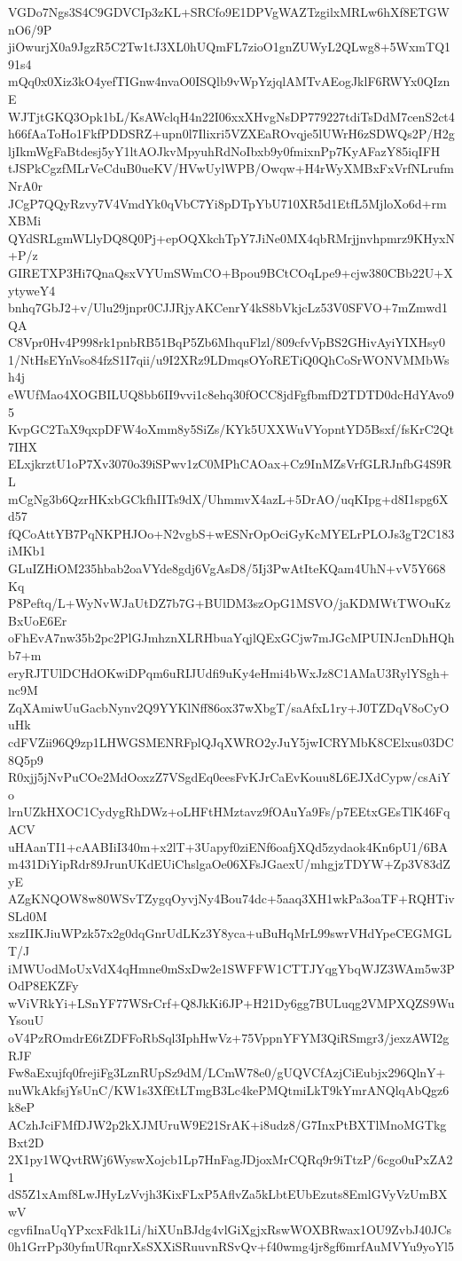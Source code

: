 VGDo7Ngs3S4C9GDVCIp3zKL+SRCfo9E1DPVgWAZTzgilxMRLw6hXf8ETGWnO6/9P
jiOwurjX0a9JgzR5C2Tw1tJ3XL0hUQmFL7zioO1gnZUWyL2QLwg8+5WxmTQ191s4
mQq0x0Xiz3kO4yefTIGnw4nvaO0ISQlb9vWpYzjqlAMTvAEogJklF6RWYx0QIznE
WJTjtGKQ3Opk1bL/KsAWclqH4n22I06xxXHvgNsDP779227tdiTsDdM7cenS2ct4
h66fAaToHo1FkfPDDSRZ+upn0l7Ilixri5VZXEaROvqje5lUWrH6zSDWQs2P/H2g
ljIkmWgFaBtdesj5yY1ltAOJkvMpyuhRdNoIbxb9y0fmixnPp7KyAFazY85iqIFH
tJSPkCgzfMLrVeCduB0ueKV/HVwUylWPB/Owqw+H4rWyXMBxFxVrfNLrufmNrA0r
JCgP7QQyRzvy7V4VmdYk0qVbC7Yi8pDTpYbU710XR5d1EtfL5MjloXo6d+rmXBMi
QYdSRLgmWLlyDQ8Q0Pj+epOQXkchTpY7JiNe0MX4qbRMrjjnvhpmrz9KHyxN+P/z
GIRETXP3Hi7QnaQsxVYUmSWmCO+Bpou9BCtCOqLpe9+cjw380CBb22U+XytyweY4
bnhq7GbJ2+v/Ulu29jnpr0CJJRjyAKCenrY4kS8bVkjcLz53V0SFVO+7mZmwd1QA
C8Vpr0Hv4P998rk1pnbRB51BqP5Zb6MhquFlzl/809cfvVpBS2GHivAyiYIXHsy0
1/NtHsEYnVso84fzS1I7qii/u9I2XRz9LDmqsOYoRETiQ0QhCoSrWONVMMbWsh4j
eWUfMao4XOGBILUQ8bb6II9vvi1c8ehq30fOCC8jdFgfbmfD2TDTD0dcHdYAvo95
KvpGC2TaX9qxpDFW4oXmm8y5SiZs/KYk5UXXWuVYopntYD5Bsxf/fsKrC2Qt7IHX
ELxjkrztU1oP7Xv3070o39iSPwv1zC0MPhCAOax+Cz9InMZsVrfGLRJnfbG4S9RL
mCgNg3b6QzrHKxbGCkfhIITs9dX/UhmmvX4azL+5DrAO/uqKIpg+d8I1spg6Xd57
fQCoAttYB7PqNKPHJOo+N2vgbS+wESNrOpOciGyKcMYELrPLOJs3gT2C183iMKb1
GLuIZHiOM235hbab2oaVYde8gdj6VgAsD8/5Ij3PwAtIteKQam4UhN+vV5Y668Kq
P8Peftq/L+WyNvWJaUtDZ7b7G+BUlDM3szOpG1MSVO/jaKDMWtTWOuKzBxUoE6Er
oFhEvA7nw35b2pc2PlGJmhznXLRHbuaYqjlQExGCjw7mJGcMPUINJcnDhHQhb7+m
eryRJTUlDCHdOKwiDPqm6uRIJUdfi9uKy4eHmi4bWxJz8C1AMaU3RylYSgh+nc9M
ZqXAmiwUuGacbNynv2Q9YYKlNff86ox37wXbgT/saAfxL1ry+J0TZDqV8oCyOuHk
cdFVZii96Q9zp1LHWGSMENRFplQJqXWRO2yJuY5jwICRYMbK8CElxus03DC8Q5p9
R0xjj5jNvPuCOe2MdOoxzZ7VSgdEq0eesFvKJrCaEvKouu8L6EJXdCypw/csAiYo
lrnUZkHXOC1CydygRhDWz+oLHFtHMztavz9fOAuYa9Fs/p7EEtxGEsTlK46FqACV
uHAanTI1+cAABIiI340m+x2lT+3Uapyf0ziENf6oafjXQd5zydaok4Kn6pU1/6BA
m431DiYipRdr89JrunUKdEUiChslgaOe06XFsJGaexU/mhgjzTDYW+Zp3V83dZyE
AZgKNQOW8w80WSvTZygqOyvjNy4Bou74dc+5aaq3XH1wkPa3oaTF+RQHTivSLd0M
xszIIKJiuWPzk57x2g0dqGnrUdLKz3Y8yca+uBuHqMrL99swrVHdYpeCEGMGLT/J
iMWUodMoUxVdX4qHmne0mSxDw2e1SWFFW1CTTJYqgYbqWJZ3WAm5w3POdP8EKZFy
wViVRkYi+LSnYF77WSrCrf+Q8JkKi6JP+H21Dy6gg7BULuqg2VMPXQZS9WuYsouU
oV4PzROmdrE6tZDFFoRbSql3IphHwVz+75VppnYFYM3QiRSmgr3/jexzAWI2gRJF
Fw8aExujfq0frejiFg3LznRUpSz9dM/LCmW78e0/gUQVCfAzjCiEubjx296QlnY+
nuWkAkfsjYsUnC/KW1s3XfEtLTmgB3Lc4kePMQtmiLkT9kYmrANQlqAbQgz6k8eP
ACzhJciFMfDJW2p2kXJMUruW9E21SrAK+i8udz8/G7InxPtBXTlMnoMGTkgBxt2D
2X1py1WQvtRWj6WyswXojcb1Lp7HnFagJDjoxMrCQRq9r9iTtzP/6cgo0uPxZA21
dS5Z1xAmf8LwJHyLzVvjh3KixFLxP5AflvZa5kLbtEUbEzuts8EmlGVyVzUmBXwV
cgvfiInaUqYPxcxFdk1Li/hiXUnBJdg4vlGiXgjxRswWOXBRwax1OU9ZvbJ40JCs
0h1GrrPp30yfmURqnrXsSXXiSRuuvnRSvQv+f40wmg4jr8gf6mrfAuMVYu9yoYl5
